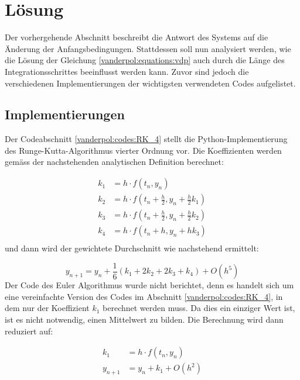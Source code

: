 %
%
%
\section{Lösung
\label{vanderpol:section:loesung}}
Der vorhergehende Abschnitt beschreibt die Antwort des Systems auf die Änderung der Anfangsbedingungen. Stattdessen soll nun analysiert werden, wie die Lösung der Gleichung \ref{vanderpol:equations:vdp} auch durch die Länge des Integrationsschrittes beeinflusst werden kann. Zuvor sind jedoch die verschiedenen Implementierungen der wichtigsten verwendeten Codes aufgelistet.
\subsection{Implementierungen 
\label{vanderpol:subsection:implementierungen }}

Der Codeabschnitt \ref{vanderpol:codes:RK_4} stellt die Python-Implementierung des Runge-Kutta-Algorithmus vierter Ordnung vor. Die Koeffizienten werden gemäss der nachstehenden analytischen Definition berechnet:

\begin{align*}
k_1 &= h \cdot f(t_n, y_n) \\
k_2 &= h \cdot f\left(t_n + \frac{h}{2}, y_n + \frac{h}{2} k_1\right) \\
k_3 &= h \cdot f\left(t_n + \frac{h}{2}, y_n + \frac{h}{2} k_2\right) \\
k_4 &= h \cdot f(t_n + h, y_n + h k_3) \\
\end{align*}
und dann wird der gewichtete Durchschnitt wie nachstehend ermittelt:

\begin{equation}
y_{n+1} = y_n + \frac{1}{6}(k_1 + 2k_2 + 2k_3 + k_4) +O(h^5)
\end{equation}
Der Code des Euler Algorithmus wurde nicht berichtet, denn es handelt sich um eine vereinfachte Version des Codes im Abschnitt \ref{vanderpol:codes:RK_4}, in dem nur der Koeffizient $k_1$ berechnet werden muss. Da dies ein einziger Wert ist, ist es nicht notwendig, einen Mittelwert zu bilden. Die Berechnung wird dann reduziert auf:

\begin{align*}
k_1 &= h \cdot f(t_n, y_n) \\
y_{n+1} &= y_n + k_1 +O(h^2)
\end{align*}

